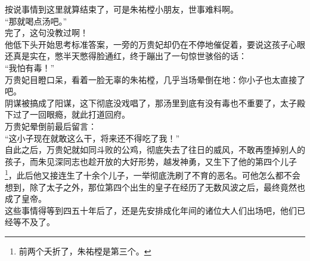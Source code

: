 \begin{multicols}{\theparacolNo}
按说事情到这里就算结束了，可是朱祐樘小朋友，世事难料啊。\\

“那就喝点汤吧。”\\

完了，这句没教过啊！\\

他低下头开始思考标准答案，一旁的万贵妃却仍在不停地催促着，要说这孩子心眼还真是实在，憋半天憋得脸通红，终于蹦出了一句惊世骇俗的话：\\

“我怕有毒！”\\

万贵妃目瞪口呆，看着一脸无辜的朱祐樘，几乎当场晕倒在地：你小子也太直接了吧。\\

阴谋被搞成了阳谋，这下彻底没戏唱了，那汤里到底有没有毒也不重要了，太子殿下过了一回眼瘾，就此打道回府。\\

万贵妃晕倒前最后留言：\\

“这小子现在就敢这么干，将来还不得吃了我！”\\

自此之后，万贵妃就如同斗败的公鸡，彻底失去了往日的威风，不敢再堕掉别人的孩子，而朱见深同志也趁开放的大好形势，越发神勇，又生下了他的第四个儿子\footnote{前两个夭折了，朱祐樘是第三个。}，此后他又接连生了十余个儿子，一举彻底洗刷了不育的恶名。可他怎么都不会想到，除了太子之外，那位第四个出生的皇子在经历了无数风波之后，最终竟然也成了皇帝。\\

这些事情得等到四五十年后了，还是先安排成化年间的诸位大人们出场吧，他们已经等不及了。\\
\ifnum{}
	\end{multicols}
\fi
\newpage
